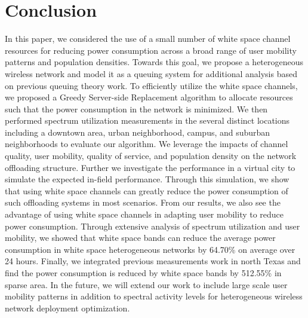 \section{Conclusion}
\label{sec:conclusion}
In this paper, we considered the use of a small number of white space channel resources for reducing power consumption across a broad range of user mobility patterns and population densities. 
Towards this goal, we propose a heterogeneous wireless network and model it as a queuing system for additional analysis based on previous queuing theory work. 
To efficiently utilize the white space channels, we proposed a Greedy Server-side Replacement algorithm to allocate resources such that the power consumption in the network is minimized. 
We then performed spectrum utilization measurements in the several distinct locations including a downtown area, urban neighborhood, campus, and suburban neighborhoods to evaluate our algorithm. 
We leverage the impacts of channel quality, user mobility, quality of service, and population density on the network offloading structure. 
Further we investigate the performance in a virtual city to simulate the expected in-field performance. 
Through this simulation, we show that using white space channels can greatly reduce the power consumption of such offloading systems in most scenarios. 
From our results, we also see the advantage of using white space channels in adapting user mobility to reduce power consumption. 
Through extensive analysis of spectrum utilization and user mobility, we showed that white space bands can reduce the average power consumption in white space heterogeneous networks by 64.70\% on average over 24 hours. 
Finally, we integrated previous measurements work in north Texas and find the power consumption is reduced by white space bands by 512.55\% in sparse area.
In the future, we will extend our work to include large scale user mobility patterns in addition to spectral activity levels for heterogeneous wireless network deployment optimization.

